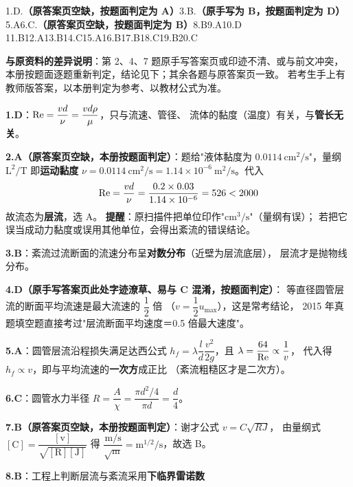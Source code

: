 \noindent 1.D.\textbf{（原答案页空缺，按题面判定为 A）}\quad 3.B.\textbf{（原手写为 B，按题面判定为 D）}
\quad 5.A\quad 6.C.\textbf{（原答案页空缺，按题面判定为 B）}\quad 8.B\quad 9.A\quad 10.D
\quad 11.B\quad 12.A\quad 13.B\quad 14.C\quad 15.A\quad 16.B\quad 17.B\quad 18.C\quad 19.B\quad 20.C

\begin{tishi}
\textbf{与原资料的差异说明}：第 2、4、7 题原手写答案页或印迹不清、或与前文冲突，
本册按题面逐题重新判定，结论见下；其余各题与原答案页一致。
若考生手上有教师版答案，以本册判定为参考、以教材公式为准。
\end{tishi}

\begin{tishi}
\begin{xiaowen}
\item \textbf{1.D}：$\mathrm{Re}=\dfrac{vd}{\nu}=\dfrac{vd\rho}{\mu}$，只与流速、管径、
流体的黏度（温度）有关，与\textbf{管长无关}。
\item \textbf{2.A（原答案页空缺，本册按题面判定）}：题给"液体黏度为
$0.0114\ \mathrm{cm^2/s}$"，量纲 $\mathrm{L^2/T}$ 即\textbf{运动黏度}
$\nu=0.0114\ \mathrm{cm^2/s}=1.14\times10^{-6}\ \mathrm{m^2/s}$。代入
\[ \mathrm{Re}=\frac{vd}{\nu}=\frac{0.2\times0.03}{1.14\times10^{-6}}=526<2000 \]
故流态为\textbf{层流}，选 A。
\textbf{提醒}：原扫描件把单位印作"$\mathrm{cm^3/s}$"（量纲有误）；
若把它误当成动力黏度或误用其他单位，会得出紊流的错误结论。
\item \textbf{3.B}：紊流过流断面的流速分布呈\textbf{对数分布}（近壁为层流底层），
层流才是抛物线分布。
\item \textbf{4.D（原手写答案页此处字迹潦草、易与 C 混淆，按题面判定）}：
等直径圆管层流的断面平均流速是最大流速的 $\dfrac{1}{2}$ 倍
（$v=\dfrac{1}{2}u_{\max}$），这是常考结论，
2015 年真题填空题直接考过"层流断面平均速度＝0.5 倍最大速度"。
\item \textbf{5.A}：圆管层流沿程损失满足达西公式
$h_f=\lambda\dfrac{l}{d}\dfrac{v^2}{2g}$，且 $\lambda=\dfrac{64}{\mathrm{Re}}\propto\dfrac{1}{v}$，
代入得 $h_f\propto v$，即与平均流速的\textbf{一次方}成正比
（紊流粗糙区才是二次方）。
\item \textbf{6.C}：圆管水力半径
$R=\dfrac{A}{\chi}=\dfrac{\pi d^2/4}{\pi d}=\dfrac{d}{4}$。
\item \textbf{7.B（原答案页空缺，本册按题面判定）}：谢才公式 $v=C\sqrt{RJ}$，
由量纲式 $\mathrm{[C]=\dfrac{[v]}{\sqrt{[R][J]}}}$ 得
$\dfrac{\mathrm{m/s}}{\sqrt{\mathrm{m}}}=\mathrm{m^{1/2}/s}$，故选 B。
\item \textbf{8.B}：工程上判断层流与紊流采用\textbf{下临界雷诺数}

\end{xiaowen}
\end{tishi}

